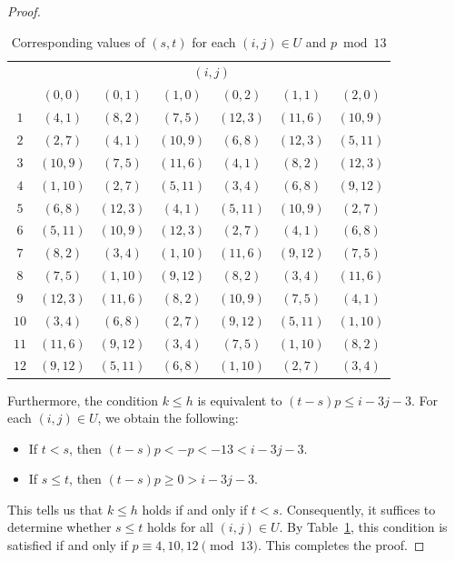\documentclass{article}
\theoremstyle{definition}
\begin{document}
\begin{proof}
\newpage
\begin{table}[tbp]\vspace{-6mm}
    \centering
    \hspace{-1mm}
    \begin{tabular}{c|cccccc}
       \multicolumn{1}{c}{} & \multicolumn{6}{c}{$(i,j)$}\\[2mm]
       & $(0,0)$ & $(0,1)$ & $(1,0)$ & $(0,2)$ & $(1,1)$ & $(2,0)$\\\hline
       $1$ & $(4,1)$ & $(8,2)$ & $(7,5)$ & $(12,3)$ & $(11,6)$ & $(10,9)$\\
       $2$ & $(2,7)$ & $(4,1)$ & $(10,9)$ & $(6,8)$ & $(12,3)$ & $(5,11)$\\
       $3$ & $(10,9)$ & $(7,5)$ & $(11,6)$ & $(4,1)$ & $(8,2)$ & $(12,3)$\\
       $4$ & $(1,10)$ & $(2,7)$ & $(5,11)$ & $(3,4)$ & $(6,8)$ & $(9,12)$\\
       $5$ & $(6,8)$ & $(12,3)$ & $(4,1)$ & $(5,11)$ & $(10,9)$ & $(2,7)$\\
       $6$ & $(5,11)$ & $(10,9)$ & $(12,3)$ & $(2,7)$ & $(4,1)$ & $(6,8)$\\
       $7$ & $(8,2)$ & $(3,4)$ & $(1,10)$ & $(11,6)$ & $(9,12)$ & $(7,5)$\\
       $8$ & $(7,5)$ & $(1,10)$ & $(9,12)$ & $(8,2)$ & $(3,4)$ & $(11,6)$\\
       $9$ & $(12,3)$ & $(11,6)$ & $(8,2)$ & $(10,9)$ & $(7,5)$ & $(4,1)$\\
       $10$ & $(3,4)$ & $(6,8)$ & $(2,7)$ & $(9,12)$ & $(5,11)$ & $(1,10)$\\
       $11$ & $(11,6)$ & $(9,12)$ & $(3,4)$ & $(7,5)$ & $(1,10)$ & $(8,2)$\\
       $12$ & $(9,12)$ & $(5,11)$ & $(6,8)$ & $(1,10)$ & $(2,7)$ & $(3,4)$
    \end{tabular}\vspace{-1mm}
    \caption{Corresponding values of $(s,t)$ for each $(i,j) \in U$ and $p \bmod{13}$}\label{tbl:st}
\end{table}

Furthermore, the condition $k \leq h$ is equivalent to $(t-s)p \leq i-3j-3$.
For each $(i,j) \in U$, we obtain the following:\vspace{-0.4mm}
\begin{itemize}
    \item If $t < s$, then $(t-s)p < -p < -13 < i-3j-3$.\vspace{-2.4mm}
    \item If $s \leq t$, then $(t-s)p \geq 0 > i-3j-3$.\vspace{0.4mm}
\end{itemize}
This tells us that $k \leq h$ holds if and only if $t < s$.
Consequently, it suffices to determine whether $s \leq t$ holds for all $(i,j) \in U$.
By Table~\ref{tbl:st}, this condition is satisfied if and only if $p \equiv 4, 10, 12 \pmod{13}$.
This completes the proof.
\end{proof}
\end{document}
